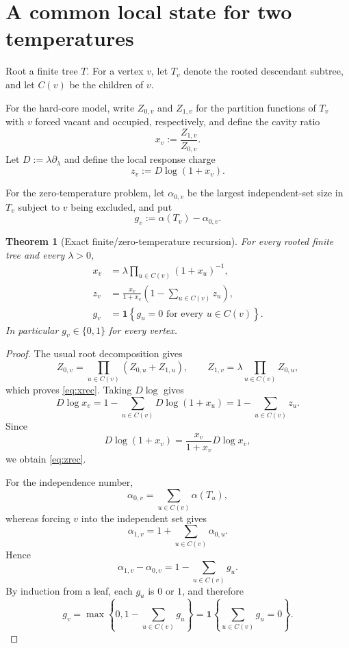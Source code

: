 \documentclass[11pt,a4paper]{article}
\newtheorem{theorem}{Theorem}
\theoremstyle{definition}
\theoremstyle{remark}
\newcommand{\1}{\mathbf 1}
\begin{document}
\section{A common local state for two temperatures}

Root a finite tree $T$.  For a vertex $v$, let $T_v$ denote the rooted descendant subtree,
and let $C(v)$ be the children of $v$.

For the hard-core model, write $Z_{0,v}$ and $Z_{1,v}$ for the partition functions of
$T_v$ with $v$ forced vacant and occupied, respectively, and define the cavity ratio
\begin{equation}
  x_v:=\frac{Z_{1,v}}{Z_{0,v}}.
  \label{eq:xdef}
\end{equation}
Let $D:=\lambda\partial_\lambda$ and define the local response charge
\begin{equation}
  z_v:=D\log(1+x_v).
  \label{eq:zdef}
\end{equation}

For the zero-temperature problem, let $\alpha_{0,v}$ be the largest independent-set size
in $T_v$ subject to $v$ being excluded, and put
\begin{equation}
  g_v:=\alpha(T_v)-\alpha_{0,v}.
  \label{eq:gdef}
\end{equation}

\begin{theorem}[Exact finite/zero-temperature recursion]
\label{thm:local-recursion}
For every rooted finite tree and every $\lambda>0$,
\begin{align}
  x_v
  &=\lambda\prod_{u\in C(v)}(1+x_u)^{-1},
  \label{eq:xrec}\\
  z_v
  &=\frac{x_v}{1+x_v}
    \left(1-\sum_{u\in C(v)}z_u\right),
  \label{eq:zrec}\\
  g_v
  &=\1\!\left\{g_u=0\text{ for every }u\in C(v)\right\}.
  \label{eq:grec}
\end{align}
In particular $g_v\in\{0,1\}$ for every vertex.
\end{theorem}

\begin{proof}
The usual root decomposition gives
\[
  Z_{0,v}=\prod_{u\in C(v)}(Z_{0,u}+Z_{1,u}),
  \qquad
  Z_{1,v}=\lambda\prod_{u\in C(v)}Z_{0,u},
\]
which proves \eqref{eq:xrec}.  Taking $D\log$ gives
\[
  D\log x_v
  =1-\sum_{u\in C(v)}D\log(1+x_u)
  =1-\sum_{u\in C(v)}z_u.
\]
Since
\[
  D\log(1+x_v)=\frac{x_v}{1+x_v}D\log x_v,
\]
we obtain \eqref{eq:zrec}.

For the independence number,
\[
  \alpha_{0,v}=\sum_{u\in C(v)}\alpha(T_u),
\]
whereas forcing $v$ into the independent set gives
\[
  \alpha_{1,v}=1+\sum_{u\in C(v)}\alpha_{0,u}.
\]
Hence
\[
  \alpha_{1,v}-\alpha_{0,v}
  =1-\sum_{u\in C(v)}g_u.
\]
By induction from a leaf, each $g_u$ is $0$ or $1$, and therefore
\[
  g_v
  =\max\left\{0,1-\sum_{u\in C(v)}g_u\right\}
  =\1\!\left\{\sum_{u\in C(v)}g_u=0\right\}.
\]
\end{proof}
\end{document}
